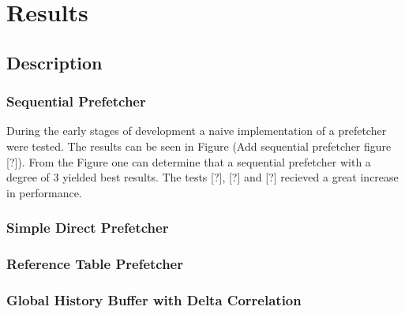 \section{Results}
\label{sec:results}
\subsection{Description}
\subsubsection{Sequential Prefetcher}
During the early stages of development a naive implementation of a prefetcher were tested.
The results can be seen in Figure (Add sequential prefetcher figure [?]).
From the Figure one can determine that a sequential prefetcher with a degree of 3 yielded best results.
The tests [?], [?] and [?] recieved a great increase in performance.

\subsubsection{Simple Direct Prefetcher}


\subsubsection{Reference Table Prefetcher}


\subsubsection{Global History Buffer with Delta Correlation}
